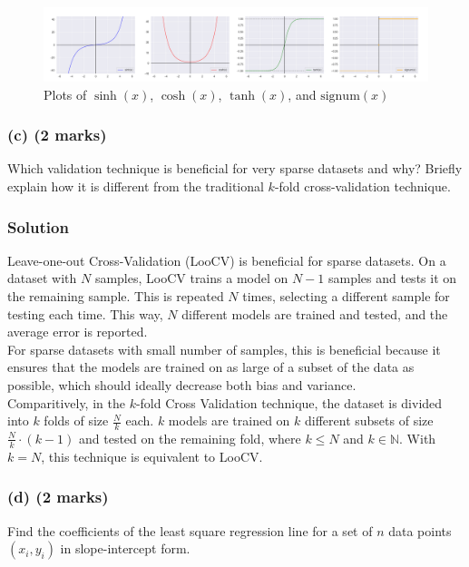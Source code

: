 \documentclass[12pt]{article}
\begin{document}
    \begin{figure}[h]
        \centering
        \includegraphics[width=1.0\textwidth]{./../Assets/plots.png}
        \caption{Plots of $\sinh{(x)}$, $\cosh{(x)}$, $\tanh{(x)}$, and $\text{signum}{(x)}$}
    \end{figure}

    \subsubsection*{(c) (2 marks)}
    Which validation technique is beneficial for very sparse datasets and why? Briefly explain how it is different from the
    traditional $k$-fold cross-validation technique.

    \subsubsection*{Solution}
    Leave-one-out Cross-Validation (LooCV) is beneficial for sparse datasets. On a dataset with $N$ samples, LooCV trains a model
    on $N - 1$ samples and tests it on the remaining sample. This is repeated $N$ times, selecting a different sample for testing
    each time. This way, $N$ different models are trained and tested, and the average error is reported.
    \vspace*{5pt} \\
    For sparse datasets with small number of samples, this is beneficial because it ensures that the models are trained on as
    large of a subset of the data as possible, which should ideally decrease both bias and variance.
    \vspace*{5pt} \\
    Comparitively, in the $k$-fold Cross Validation technique, the dataset is divided into $k$ folds of size $\frac{N}{k}$
    each. $k$ models are trained on $k$ different subsets of size $\frac{N}{k} \cdot (k - 1)$ and tested on the remaining fold,
    where $k \leq N$ and $k \in \mathbb{N}$. With $k = N$, this technique is equivalent to LooCV.

    \subsubsection*{(d) (2 marks)}
    Find the coefficients of the least square regression line for a set of $n$ data points $(x_{i}, y_{i})$ in slope-intercept form.
\end{document}
